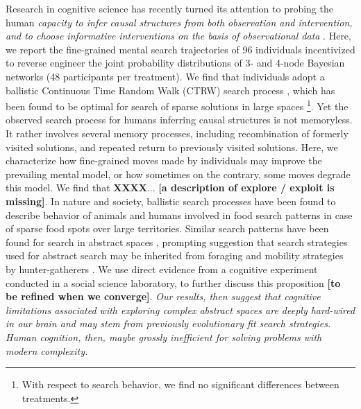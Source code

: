 Research in cognitive science has recently turned its attention to probing the human {\it capacity to infer causal structures from both observation and intervention, and to choose informative interventions on the basis of observational data} \cite{steyvers2003inferring,pearl2009causality}. Here, we report the fine-grained mental search trajectories of 96 individuals incentivized to reverse engineer the joint probability distributions of 3- and 4-node Bayesian networks (48 participants per treatment). We find that individuals adopt a ballistic Continuous Time Random Walk (CTRW) search process \cite{}, which has been found to be optimal for search of sparse solutions in large spaces \cite{viswanathan_optimizing_1999,edwards_revisiting_2007,song_modelling_2010,viswanathan_physics_2011}\footnote{With respect to search behavior, we find no significant differences between treatments.}. Yet the observed search process for humans inferring causal structures is not memoryless. It rather involves several memory processes, including recombination of formerly visited solutions, and repeated return to previously visited solutions. Here, we characterize how fine-grained moves made by individuals may improve the prevailing mental model, or how sometimes on the contrary, some moves degrade this model. We find that {\bf XXXX}... {\bf [a description of explore / exploit is missing]}. In nature and society, ballistic search processes have been found to describe behavior of animals \cite{baronchelli_levy_2013} and humans \cite{gonzalez_understanding_2008,song_modelling_2010,rhee_levy-walk_2011} involved in food search patterns in case of sparse food spots over large territories. Similar search patterns have been found for search in abstract spaces \cite{rhodes_human_2007,radicchi_rationality_2012,radicchi_evolution_2012}, prompting suggestion that search strategies used for abstract search \cite{baronchelli_levy_2013} may be inherited from foraging and mobility strategies by hunter-gatherers \cite{brown_levy_2007,raichlen_evidence_2014}. We use direct evidence from a cognitive experiment conducted in a social science laboratory, to further discuss this proposition {\bf [to be refined when we converge]}. {\it Our results, then suggest that cognitive limitations associated with exploring complex abstract spaces are deeply hard-wired in our brain and may stem from previously evolutionary fit search strategies.  Human cognition, then, maybe grossly inefficient for solving problems with modern complexity.}

